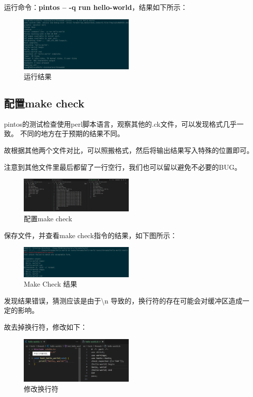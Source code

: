 运行命令：\textbf{pintos -- -q run hello-world}，结果如下所示：

\begin{figure}[H]
  \centering
  \includegraphics[width=0.5\textwidth]{img2/success.png}
  \caption{运行结果}
\end{figure}

\subsection{配置make check}

pintos的测试检查使用perl脚本语言，观察其他的.ck文件，可以发现格式几乎一致。
不同的地方在于预期的结果不同。

故根据其他两个文件对比，可以照搬格式，然后将输出结果写入特殊的位置即可。

注意到其他文件里最后都留了一行空行，我们也可以留以避免不必要的BUG。

\begin{figure}[H]
  \centering
  \includegraphics[width=0.5\textwidth]{img2/final.png}
  \caption{配置make check}
\end{figure}

保存文件，并查看make check指令的结果，如下图所示：

\begin{figure}[H]
  \centering
  \includegraphics[width=0.5\textwidth]{img2/fault.png}
  \caption{Make Check 结果}
\end{figure}

发现结果错误，猜测应该是由于\textbackslash n 导致的，换行符的存在可能会对缓冲区造成一定的影响。

故去掉换行符，修改如下：

\begin{figure} [H]
  \centering
  \includegraphics[width=0.5\textwidth]{img2/change.png}
  \caption{修改换行符}
\end{figure}


